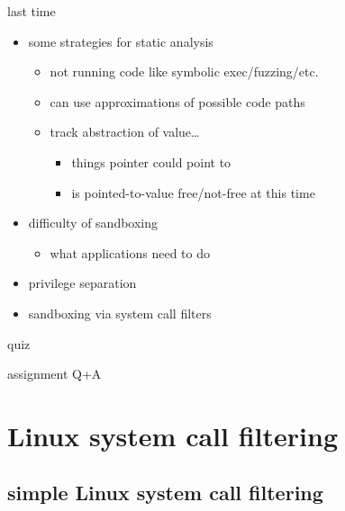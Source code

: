 \date{}
\title{}
\date{}
\usepackage[outputdir=latex.out]{minted}

\begin{frame}
    \titlepage
\end{frame}



\begin{frame}{last time}
    \begin{itemize}
    \item some strategies for static analysis
        \begin{itemize}
        \item not running code like symbolic exec/fuzzing/etc.
        \item can use approximations of possible code paths
        \item track abstraction of value\ldots
            \begin{itemize}
            \item things pointer could point to
            \item is pointed-to-value free/not-free at this time
            \end{itemize}
        \end{itemize}
    \item difficulty of sandboxing
        \begin{itemize}
        \item what applications need to do
        \end{itemize}
    \item privilege separation
    \item sandboxing via system call filters
    \end{itemize}
\end{frame}

\begin{frame}{quiz}
\end{frame}

\begin{frame}{assignment Q+A}
\end{frame}

\section{Linux system call filtering}
\subsection{simple Linux system call filtering}


